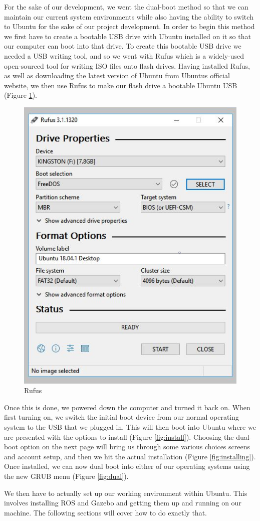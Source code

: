 \documentclass[12pt]{article}
\begin{document}
For the sake of our development, we went the dual-boot method so that we can maintain our current system environments while also having the ability to switch to Ubuntu for the sake of our project development. In order to begin this method we first have to create a bootable USB drive with Ubuntu installed on it so that our computer can boot into that drive. To create this bootable USB drive we needed a USB writing tool, and so we went with Rufus which is a widely-used open-sourced tool for writing ISO files onto flash drives. Having installed Rufus, as well as downloading the latest version of Ubuntu from Ubuntus official website, we then use Rufus to make our flash drive a bootable Ubuntu USB (Figure \ref{fig:rufus}).





\begin{figure}[h]
	\centering
	\includegraphics[width=0.50\linewidth]{rufus}
	\caption{Rufus}
	\label{fig:rufus}
\end{figure}

Once this is done, we powered down the computer and turned it back on. When first turning on, we switch the initial boot device from our normal operating system to the USB that we plugged in. This will then boot into Ubuntu where we are presented with the options to install (Figure \ref{fig:install}). Choosing the dual-boot option on the next page will bring us through some various choices screens and account setup, and then we hit the actual installation (Figure \ref{fig:installing}). Once installed, we can now dual boot into either of our operating systems using the new GRUB menu (Figure \ref{fig:dual}).

We then have to actually set up our working environment within Ubuntu. This involves installing ROS and Gazebo and getting them up and running on our machine. The following sections will cover how to do exactly that.
\end{document}
